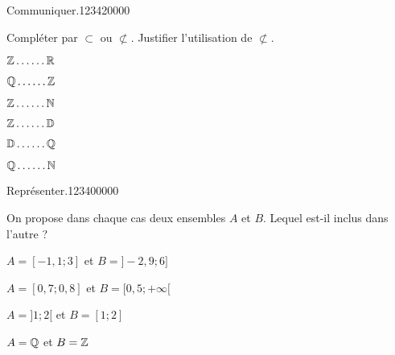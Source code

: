 \begin{pageAD}  %
\restoregeometry %

 
  
\begin{ExoCad}{Communiquer.}{1234}{2}{0}{0}{0}{0}

Compléter par $\subset$  ou $\not\subset$. Justifier l'utilisation de  $\not\subset$.

\begin{enumerate}
\begin{minipage}{0.49\linewidth}
\item $\mathbb Z \ldots \ldots \mathbb R$ 
\item $\mathbb Q \ldots \ldots \mathbb Z$ 
\item $\mathbb Z \ldots \ldots \mathbb N$ 
\end{minipage}
\hfill
\begin{minipage}{0.49\linewidth}
\item $\mathbb Z \ldots \ldots \mathbb D$ 
\item $\mathbb D \ldots \ldots \mathbb Q$ 
\item $\mathbb Q \ldots \ldots \mathbb N$ 
\end{minipage}
\end{enumerate}
 
\end{ExoCad}

\begin{ExoCad}{Représenter.}{1234}{0}{0}{0}{0}{0}

On propose dans chaque cas deux ensembles $A$ et $B$. Lequel est-il inclus dans l'autre ? \vspace{0.2cm} 

\begin{enumerate}

\begin{minipage}{0.48\linewidth}
\item $A=[-1,1;3]$ et $B=]-2,9;6]$ 
\item $A=[0,7;0,8]$ et $B=[0,5;+\infty[$
\end{minipage}
\hfill
\begin{minipage}{0.48\linewidth}
\item $A=]1;2[$ et $B=[1;2]$
\item $A=\mathbb Q$ et $B=\mathbb Z$
\end{minipage}

\end{enumerate}
 

\end{ExoCad}
\end{pageAD}
